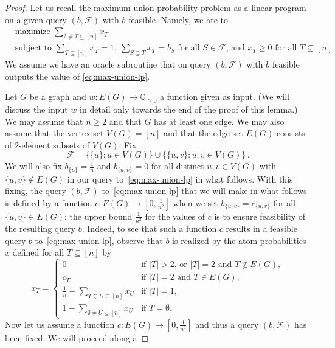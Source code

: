 \documentclass[10pt,a4paper]{amsart}
\begin{document}
\begin{proof}
Let us recall the maximum union probability problem as a linear program 
on a given query $(b,\mathcal{F})$ with $b$ feasible. Namely, we are to
\begin{equation}
\label{eq:max-union-lp}
\begin{split}
&\text{maximize $\sum_{\emptyset\neq T\subseteq[n]}x_T$}\\
&\text{subject to $\sum_{T\subseteq[n]}x_T=1$, $\sum_{S\subseteq T}x_T=b_S$ for all $S\in\mathcal{F}$, and $x_T\geq 0$ for all $T\subseteq[n]$}\,. 
\end{split}
\end{equation}
We assume we have an oracle subroutine that on query
$(b,\mathcal{F})$ with $b$ feasible 
outputs the value of \eqref{eq:max-union-lp}.

Let $G$ be a graph and $w:E(G)\rightarrow\mathbb{Q}_{\geq 0}$ a function
given as input. (We will discuss the input $w$ in detail only towards
the end of the proof of this lemma.) 
We may assume that $n\geq 2$ and that $G$ has at least one edge.
We may also assume that the vertex set $V(G)=[n]$ and that the edge
set $E(G)$ consists of $2$-element subsets of $V(G)$.
Fix
\[
\mathcal{F}=\{\{u\}:u\in V(G)\}\cup\{\{u,v\}:u,v\in V(G)\}\,.
\]
We will also fix $b_{\{u\}}=\frac{1}{n}$ and $b_{\{u,v\}}=0$ 
for all distinct $u,v\in V(G)$ with $\{u,v\}\notin E(G)$ in our
query to~\eqref{eq:max-union-lp} in what follows. 
With this fixing, the query $(b,\mathcal{F})$ 
to~\eqref{eq:max-union-lp} that we will make in what follows 
is defined by a function $c:E(G)\rightarrow[0,\frac{1}{n^2}]$ when we set
$b_{\{u,v\}}=c_{\{u,v\}}$ for all $\{u,v\}\in E(G)$; the upper bound 
$\frac{1}{n^2}$ for the values of $c$ is to ensure feasibility of the
resulting query $b$. Indeed, to see that such a function $c$ results 
in a feasible query $b$ to~\eqref{eq:max-union-lp}, observe that $b$ 
is realized by the atom probabilities $x$ defined for all $T\subseteq[n]$ by
\[
x_T=\begin{cases}
0 & \text{if $|T|>2$, or $|T|=2$ and $T\notin E(G)$},\\
c_T & \text{if $|T|=2$ and $T\in E(G)$},\\
\frac{1}{n}-\sum_{T\subsetneq U\subseteq[n]}x_U & \text{if $|T|=1$},\\
1-\sum_{\emptyset\neq U\subseteq[n]}x_U & \text{if $T=\emptyset$}.
\end{cases}
\]
Now let us assume a function $c:E(G)\rightarrow[0,\frac{1}{n^2}]$ and
thus a query $(b,\mathcal{F})$ has been fixed. We will proceed along a

\end{proof}
\end{document}
